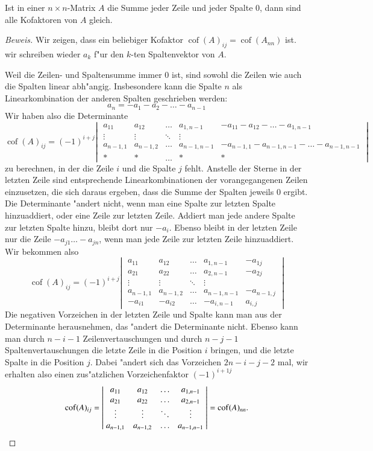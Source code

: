 \begin{hilfssatz}
Ist in einer $n\times n$-Matrix $A$ die Summe jeder Zeile und jeder
Spalte $0$, dann sind alle Kofaktoren von $A$ gleich.
\end{hilfssatz}
\begin{proof}[Beweis]
Wir zeigen, dass ein beliebiger Kofaktor
$\operatorname{cof}(A)_{ij}=\operatorname{cof}(A_{nn})$ ist.
wir schreiben wieder $a_k$ f"ur den $k$-ten Spaltenvektor von $A$.

Weil die Zeilen- und Spaltensumme immer $0$ ist, sind sowohl die
Zeilen wie auch die Spalten linear abh"angig. Insbesondere kann die Spalte
$n$ als Linearkombination der anderen Spalten geschrieben werden:
\[
a_n=-a_1-a_2-\dots-a_{n-1}
\]
Wir haben also die Determinante
\[
\operatorname{cof}(A)_{ij}
=
(-1)^{i+j}
\left|\;
\begin{matrix}
a_{11}&a_{12}&\dots &a_{1,n-1}&-a_{11}-a_{12}-\dots-a_{1,n-1}\\
\vdots&\vdots&\ddots&\vdots\\
a_{n-1,1}&a_{n-1,2}&\dots&a_{n-1,n-1}&-a_{n-1,1}-a_{n-1,n-1}-\dots-a_{n-1,n-1}\\
*&*&\dots&*&*
\end{matrix}
\;\right|
\]
zu berechnen, in der die Zeile $i$ und die Spalte $j$ fehlt. Anstelle
der Sterne in der letzten Zeile sind entsprechende Linearkombinationen
der vorangegangenen Zeilen einzusetzen, die sich daraus ergeben,
dass die Summe der Spalten jeweils $0$ ergibt.
Die Determinante "andert nicht, wenn man eine Spalte zur letzten Spalte
hinzuaddiert, oder eine Zeile zur letzten Zeile. Addiert man jede
andere Spalte zur letzten Spalte hinzu, bleibt dort nur $-a_i$.
Ebenso bleibt in der letzten Zeile nur die Zeile $-a_{j1}\dots-a_{jn}$,
wenn man jede Zeile zur letzten Zeile hinzuaddiert. Wir bekommen also
\[
\operatorname{cof}(A)_{ij}
=
(-1)^{i+j}
\left|\;
\begin{matrix}
a_{11}&a_{12}&\dots &a_{1,n-1}&-a_{1j}\\
a_{21}&a_{22}&\dots &a_{2,n-1}&-a_{2j}\\
\vdots&\vdots&\ddots&\vdots\\
a_{n-1,1}&a_{n-1,2}&\dots&a_{n-1,n-1}&-a_{n-1,j}\\
-a_{i1}&-a_{i2}&\dots&-a_{i,n-1}&a_{i,j}
\end{matrix}
\;\right|
\]
Die negativen Vorzeichen in der letzten Zeile und Spalte kann man aus
der Determinante herausnehmen, das "andert die Determinante nicht.
Ebenso kann man durch $n-i-1$ Zeilenvertauschungen und durch
$n-j-1$ Spaltenvertauschungen die letzte Zeile in die
Position $i$ bringen, und die letzte Spalte in die Position $j$.
Dabei "andert sich das Vorzeichen $2n-i-j-2$ mal, wir erhalten also
einen zus"atzlichen Vorzeichenfaktor $(-1)^{i+1j}$
\[
\operatorname{cof}(A)_{ij}=
\left|\;
\begin{matrix}
a_{11}&a_{12}&\dots&a_{1,n-1}\\
a_{21}&a_{22}&\dots&a_{2,n-1}\\
\vdots&\vdots&\ddots&\vdots\\
a_{n-1,1}&a_{n-1,2}&\dots&a_{n-1,n-1}
\end{matrix}
\;\right|
=\operatorname{cof}(A)_{nn}.
\qedhere
\]
\end{proof}
